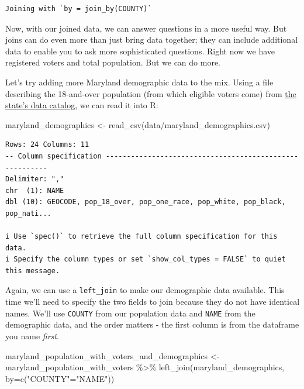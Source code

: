 \documentclass[
  letterpaper,
  DIV=11,
  numbers=noendperiod]{scrreprt}
\newenvironment{Shaded}{\begin{snugshade}}{\end{snugshade}}
\newcommand{\AttributeTok}[1]{\textcolor[rgb]{0.40,0.45,0.13}{#1}}
\newcommand{\FunctionTok}[1]{\textcolor[rgb]{0.28,0.35,0.67}{#1}}
\newcommand{\NormalTok}[1]{\textcolor[rgb]{0.00,0.23,0.31}{#1}}
\newcommand{\OtherTok}[1]{\textcolor[rgb]{0.00,0.23,0.31}{#1}}
\newcommand{\SpecialCharTok}[1]{\textcolor[rgb]{0.37,0.37,0.37}{#1}}
\newcommand{\StringTok}[1]{\textcolor[rgb]{0.13,0.47,0.30}{#1}}
\begin{document}
\begin{verbatim}
Joining with `by = join_by(COUNTY)`
\end{verbatim}

Now, with our joined data, we can answer questions in a more useful way.
But joins can do even more than just bring data together; they can
include additional data to enable you to ask more sophisticated
questions. Right now we have registered voters and total population. But
we can do more.

Let's try adding more Maryland demographic data to the mix. Using a file
describing the 18-and-over population (from which eligible voters come)
from
\href{https://planning.maryland.gov/MSDC/Pages/census/Census2020/pL_2020redistricting.aspx}{the
state's data catalog}, we can read it into R:

\begin{Shaded}
\begin{Highlighting}[]
\NormalTok{maryland\_demographics }\OtherTok{\textless{}{-}} \FunctionTok{read\_csv}\NormalTok{(}\StringTok{\textquotesingle{}data/maryland\_demographics.csv\textquotesingle{}}\NormalTok{)}
\end{Highlighting}
\end{Shaded}

\begin{verbatim}
Rows: 24 Columns: 11
-- Column specification --------------------------------------------------------
Delimiter: ","
chr  (1): NAME
dbl (10): GEOCODE, pop_18_over, pop_one_race, pop_white, pop_black, pop_nati...

i Use `spec()` to retrieve the full column specification for this data.
i Specify the column types or set `show_col_types = FALSE` to quiet this message.
\end{verbatim}

Again, we can use a \texttt{left\_join} to make our demographic data
available. This time we'll need to specify the two fields to join
because they do not have identical names. We'll use \texttt{COUNTY} from
our population data and \texttt{NAME} from the demographic data, and the
order matters - the first column is from the dataframe you name
\emph{first}.

\begin{Shaded}
\begin{Highlighting}[]
\NormalTok{maryland\_population\_with\_voters\_and\_demographics }\OtherTok{\textless{}{-}}\NormalTok{ maryland\_population\_with\_voters }\SpecialCharTok{\%\textgreater{}\%} \FunctionTok{left\_join}\NormalTok{(maryland\_demographics, }\AttributeTok{by=}\FunctionTok{c}\NormalTok{(}\StringTok{"COUNTY"}\OtherTok{=}\StringTok{"NAME"}\NormalTok{))}
\end{Highlighting}
\end{Shaded}
\end{document}
